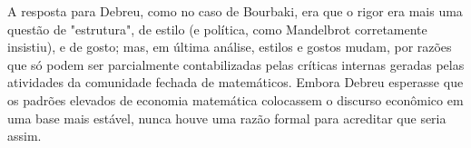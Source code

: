 \documentclass[a4paper,12pt]{article}[abntex2]
\begin{document}
A resposta para Debreu, como no caso de Bourbaki, era que o rigor era mais uma questão de "estrutura", de estilo (e política, como Mandelbrot corretamente insistiu), e de gosto; mas, em última análise, estilos e gostos mudam, por razões que só podem ser parcialmente contabilizadas pelas críticas internas geradas pelas atividades da comunidade fechada de matemáticos. Embora Debreu esperasse que os padrões elevados de economia matemática colocassem o discurso econômico em uma base mais estável, nunca houve uma razão formal para acreditar que seria assim.
\end{document}
